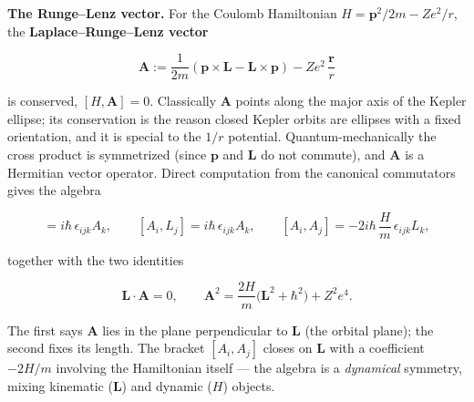 \medskip\noindent\textbf{The Runge--Lenz vector.} For the Coulomb Hamiltonian $H=\bm p^{2}/2m-Ze^{2}/r$, the \textbf{Laplace--Runge--Lenz vector}
\begin{linenomath}
\begin{equation}
\bm A:=\frac{1}{2m}(\bm p\times\bm L-\bm L\times\bm p)-Ze^{2}\,\frac{\bm r}{r}
\label{eq:runge-lenz}
\end{equation}
\end{linenomath}
is conserved, $[H,\bm A]=0$. Classically $\bm A$ points along the major axis of the Kepler ellipse; its conservation is the reason closed Kepler orbits are ellipses with a fixed orientation, and it is special to the $1/r$ potential. Quantum-mechanically the cross product is symmetrized (since $\bm p$ and $\bm L$ do not commute), and $\bm A$ is a Hermitian vector operator. Direct computation from the canonical commutators gives the algebra
\begin{linenomath}
\begin{equation}
[L_{i},A_{j}]=i\hbar\,\epsilon_{ijk}A_{k},\qquad
[A_{i},L_{j}]=i\hbar\,\epsilon_{ijk}A_{k},\qquad
[A_{i},A_{j}]=-2i\hbar\,\frac{H}{m}\,\epsilon_{ijk}L_{k},
\label{eq:runge-lenz-algebra}
\end{equation}
\end{linenomath}
together with the two identities
\begin{linenomath}
\begin{equation}
\bm L\!\cdot\!\bm A=0,\qquad
\bm A^{2}=\frac{2H}{m}\bigl(\bm L^{2}+\hbar^{2}\bigr)+Z^{2}e^{4}.
\label{eq:runge-lenz-identity}
\end{equation}
\end{linenomath}
The first says $\bm A$ lies in the plane perpendicular to $\bm L$ (the orbital plane); the second fixes its length. The bracket $[A_{i},A_{j}]$ closes on $\bm L$ with a coefficient $-2H/m$ involving the Hamiltonian itself --- the algebra is a \emph{dynamical} symmetry, mixing kinematic ($\bm L$) and dynamic ($H$) objects.

